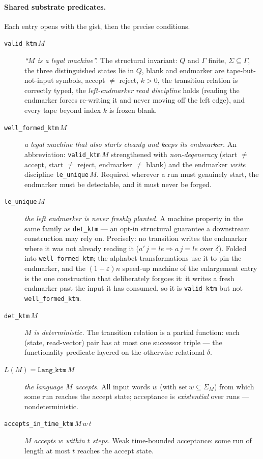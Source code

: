 \paragraph{Shared substrate predicates.}
Each entry opens with the gist, then the precise conditions.
\begin{description}
\item[\texttt{valid\_ktm}\,$M$] \emph{``$M$ is a legal machine''.}  The
  structural invariant: $Q$ and $\Gamma$ finite,
  $\Sigma \subseteq \Gamma$, the three distinguished states lie in $Q$,
  blank and endmarker are tape-but-not-input symbols,
  accept $\neq$ reject, $k > 0$, the transition relation is correctly
  typed, the \emph{left-endmarker read discipline} holds (reading the
  endmarker forces re-writing it and never moving off the left edge),
  and every tape beyond index $k$ is frozen blank.
\item[\texttt{well\_formed\_ktm}\,$M$] \emph{a legal machine that also
  starts cleanly and keeps its endmarker.}  An abbreviation:
  \texttt{valid\_ktm}\,$M$ strengthened with \emph{non-degeneracy}
  (start $\neq$ accept, start $\neq$ reject, endmarker $\neq$ blank) and
  the endmarker \emph{write} discipline \texttt{le\_unique}\,$M$.
  Required wherever a run must genuinely start, the endmarker must be
  detectable, and it must never be forged.
\item[\texttt{le\_unique}\,$M$] \emph{the left endmarker is never
  freshly planted.}  A machine property in the same family as
  \texttt{det\_ktm} --- an opt-in structural guarantee a downstream
  construction may rely on.  Precisely: no transition writes the
  endmarker where it was not already reading it
  ($a'\,j = le \Rightarrow a\,j = le$ over $\delta$).  Folded into
  \texttt{well\_formed\_ktm}; the alphabet transformations use it to
  pin the endmarker, and the $(1+\varepsilon)n$ speed-up machine of the
  enlargement entry is the one construction that deliberately forgoes
  it: it writes a fresh endmarker past the input it has consumed, so it
  is \texttt{valid\_ktm} but not \texttt{well\_formed\_ktm}.
\item[\texttt{det\_ktm}\,$M$] \emph{$M$ is deterministic.}  The
  transition relation is a partial function: each (state, read-vector)
  pair has at most one successor triple --- the functionality predicate
  layered on the otherwise relational $\delta$.
\item[$L(M) = \texttt{Lang\_ktm}\,M$] \emph{the language $M$ accepts.}
  All input words $w$ (with $\mathrm{set}\,w \subseteq \Sigma_M$) from
  which some run reaches the accept state; acceptance is
  \emph{existential} over runs --- nondeterministic.
\item[\texttt{accepts\_in\_time\_ktm}\,$M\,w\,t$] \emph{$M$ accepts
  $w$ within $t$ steps.}  Weak time-bounded acceptance: some run of
  length at most $t$ reaches the accept state.
\end{description}

